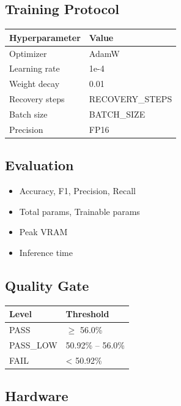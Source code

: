 \subsection{Training Protocol}

\begin{table}[H]
\centering
\small
\begin{tabular}{ll}
\toprule
\textbf{Hyperparameter} & \textbf{Value} \\
\midrule
Optimizer & AdamW \\
Learning rate & 1e-4 \\
Weight decay & 0.01 \\
Recovery steps & {{RECOVERY\_STEPS}} \\
Batch size & {{BATCH\_SIZE}} \\
Precision & FP16 \\
\bottomrule
\end{tabular}
\end{table}

\subsection{Evaluation}

\begin{itemize}
\item Accuracy, F1, Precision, Recall
\item Total params, Trainable params
\item Peak VRAM
\item Inference time

\end{itemize}
\subsection{Quality Gate}

\begin{table}[H]
\centering
\small
\begin{tabular}{ll}
\toprule
\textbf{Level} & \textbf{Threshold} \\
\midrule
PASS & $\ge$ 56.0\% \\
PASS\_LOW & 50.92\% -- 56.0\% \\
FAIL & < 50.92\% \\
\bottomrule
\end{tabular}
\end{table}

\subsection{Hardware}

